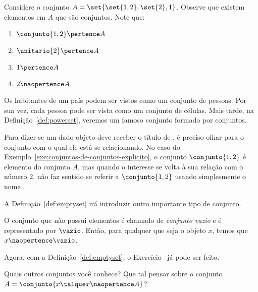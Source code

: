 \begin{example}
    \label{exe:conjuntos-de-conjuntos-explicito}
    Considere o conjunto $A = \set{\set{1,2},\set{2}, 1}$. Observe que existem elementos em $A$ que são conjuntos. Note que:
    \begin{enumerate}
        \item $\conjunto{1, 2} \pertence A$
        \item $\unitario{2} \pertence A$
        \item $1 \pertence A$
        \item $2 \naopertence A$
    \end{enumerate}
\end{example}

\begin{example}
    \label{exe:conjuntos-de-conjuntos-implicito}
    Os habitantes de um país podem ser vistos como um conjunto de pessoas. Por sua vez, cada pessoa pode ser vista como um conjunto de células. Mais tarde, na Definição~\ref{def:powerset}, veremos um famoso conjunto formado por conjuntos.
\end{example}

Para dizer se um dado objeto deve receber o título de , é preciso olhar para o conjunto com o qual ele está se relacionando. No caso do Exemplo~\ref{exe:conjuntos-de-conjuntos-explicito}, o conjunto $\conjunto{1, 2}$ é elemento do conjunto $A$, mas quando o interesse se volta à sua relação com o número $2$, não faz sentido se referir a $\conjunto{1, 2}$ usando simplesmente o nome .

A Definição~\ref{def:emptyset} irá introduzir outro importante tipo de conjunto.

\begin{definition}
    \label{def:emptyset} %
    O conjunto que não possui elementos é chamado de \emph{conjunto vazio} e é representado por $\vazio$. Então, para qualquer que seja o objeto $x$, temos que $x \naopertence \vazio$.
\end{definition}

Agora, com a Definição~\ref{def:emptyset}, o Exercício~ já pode ser feito.

\begin{example}
    Quais outros conjuntos você conhece? Que tal pensar sobre o conjunto $A = \conjunto{ x \talque x \naopertence A}$?
\end{example}
